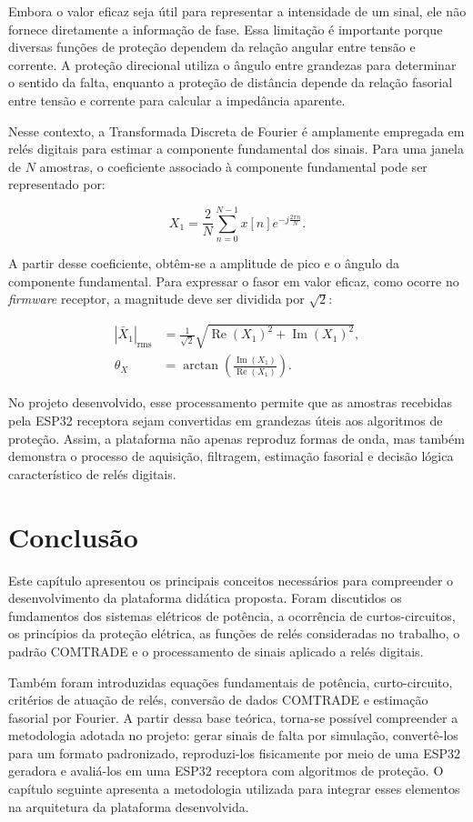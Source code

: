 Embora o valor eficaz seja útil para representar a intensidade de um sinal, ele não fornece diretamente a informação de fase. Essa limitação é importante porque diversas funções de proteção dependem da relação angular entre tensão e corrente. A proteção direcional utiliza o ângulo entre grandezas para determinar o sentido da falta, enquanto a proteção de distância depende da relação fasorial entre tensão e corrente para calcular a impedância aparente.

Nesse contexto, a Transformada Discreta de Fourier é amplamente empregada em relés digitais para estimar a componente fundamental dos sinais. Para uma janela de $N$ amostras, o coeficiente associado à componente fundamental pode ser representado por:

\begin{equation}
  X_1 = \frac{2}{N}\sum_{n=0}^{N-1} x[n]e^{-j\frac{2\pi n}{N}}.
  \label{eq:dft-fundamental}
\end{equation}

\noindent A partir desse coeficiente, obtêm-se a amplitude de pico e o ângulo da componente fundamental. Para expressar o fasor em valor eficaz, como ocorre no \textit{firmware} receptor, a magnitude deve ser dividida por $\sqrt{2}$:

\begin{align}
  |\bar{X}_1|_{\mathrm{rms}} &= \frac{1}{\sqrt{2}}\sqrt{\operatorname{Re}(X_1)^2 + \operatorname{Im}(X_1)^2}, \label{eq:magnitude-fasor}\\
  \theta_X &= \arctan\left(\frac{\operatorname{Im}(X_1)}{\operatorname{Re}(X_1)}\right). \label{eq:angulo-fasor}
\end{align}

No projeto desenvolvido, esse processamento permite que as amostras recebidas pela ESP32 receptora sejam convertidas em grandezas úteis aos algoritmos de proteção. Assim, a plataforma não apenas reproduz formas de onda, mas também demonstra o processo de aquisição, filtragem, estimação fasorial e decisão lógica característico de relés digitais.

\section{Conclusão}

Este capítulo apresentou os principais conceitos necessários para compreender o desenvolvimento da plataforma didática proposta. Foram discutidos os fundamentos dos sistemas elétricos de potência, a ocorrência de curtos-circuitos, os princípios da proteção elétrica, as funções de relés consideradas no trabalho, o padrão COMTRADE e o processamento de sinais aplicado a relés digitais.

Também foram introduzidas equações fundamentais de potência, curto-circuito, critérios de atuação de relés, conversão de dados COMTRADE e estimação fasorial por Fourier. A partir dessa base teórica, torna-se possível compreender a metodologia adotada no projeto: gerar sinais de falta por simulação, convertê-los para um formato padronizado, reproduzi-los fisicamente por meio de uma ESP32 geradora e avaliá-los em uma ESP32 receptora com algoritmos de proteção. O capítulo seguinte apresenta a metodologia utilizada para integrar esses elementos na arquitetura da plataforma desenvolvida.
